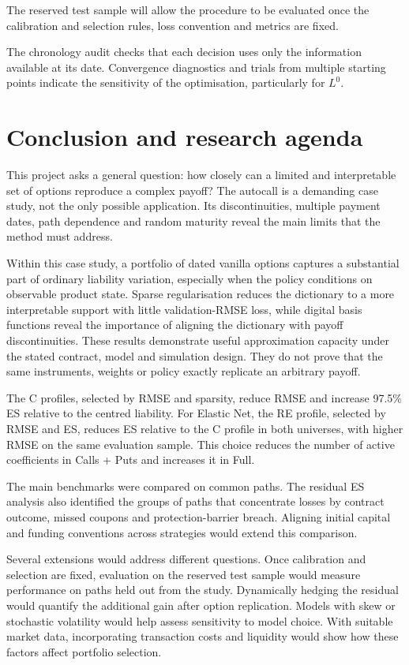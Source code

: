 \documentclass[12pt,a4paper]{article}
\newcommand{\1}{\mathbf{1}}
\begin{document}
The reserved test sample will allow the procedure to be evaluated once the calibration and selection rules, loss convention and metrics are fixed.

The chronology audit checks that each decision uses only the information available at its date. Convergence diagnostics and trials from multiple starting points indicate the sensitivity of the optimisation, particularly for $L^0$.

\section{Conclusion and research agenda}

This project asks a general question: how closely can a limited and interpretable set of options reproduce a complex payoff? The autocall is a demanding case study, not the only possible application. Its discontinuities, multiple payment dates, path dependence and random maturity reveal the main limits that the method must address.

Within this case study, a portfolio of dated vanilla options captures a substantial part of ordinary liability variation, especially when the policy conditions on observable product state. Sparse regularisation reduces the dictionary to a more interpretable support with little validation-RMSE loss, while digital basis functions reveal the importance of aligning the dictionary with payoff discontinuities. These results demonstrate useful approximation capacity under the stated contract, model and simulation design. They do not prove that the same instruments, weights or policy exactly replicate an arbitrary payoff.

The C profiles, selected by RMSE and sparsity, reduce RMSE and increase 97.5\% ES relative to the centred liability. For Elastic Net, the RE profile, selected by RMSE and ES, reduces ES relative to the C profile in both universes, with higher RMSE on the same evaluation sample. This choice reduces the number of active coefficients in Calls + Puts and increases it in Full.

The main benchmarks were compared on common paths. The residual ES analysis also identified the groups of paths that concentrate losses by contract outcome, missed coupons and protection-barrier breach. Aligning initial capital and funding conventions across strategies would extend this comparison.

Several extensions would address different questions. Once calibration and selection are fixed, evaluation on the reserved test sample would measure performance on paths held out from the study. Dynamically hedging the residual would quantify the additional gain after option replication. Models with skew or stochastic volatility would help assess sensitivity to model choice. With suitable market data, incorporating transaction costs and liquidity would show how these factors affect portfolio selection.
\end{document}
